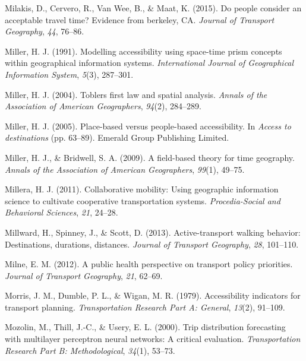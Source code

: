 \documentclass[
11pt, %
oneside, %
english, %
singlespacing, %
]{macthesis} %
\newlength{\cslhangindent}
\newenvironment{CSLReferences}[2] %
{\begin{list}{}{%
	\setlength{\itemindent}{0pt}
	\setlength{\leftmargin}{0pt}
	\setlength{\parsep}{0pt}
	\ifodd #1
	\setlength{\leftmargin}{\cslhangindent}
	\setlength{\itemindent}{-1\cslhangindent}
	\fi
	\setlength{\itemsep}{#2\baselineskip}}}
{\end{list}}
\begin{document}
\begin{CSLReferences}{1}{0}
Milakis, D., Cervero, R., Van Wee, B., \& Maat, K. (2015). Do people consider an acceptable travel time? Evidence from berkeley, CA. \emph{Journal of Transport Geography}, \emph{44}, 76--86.

Miller, H. J. (1991). Modelling accessibility using space-time prism concepts within geographical information systems. \emph{International Journal of Geographical Information System}, \emph{5}(3), 287--301.

Miller, H. J. (2004). Toblers first law and spatial analysis. \emph{Annals of the Association of American Geographers}, \emph{94}(2), 284--289.

Miller, H. J. (2005). Place-based versus people-based accessibility. In \emph{Access to destinations} (pp. 63--89). Emerald Group Publishing Limited.

Miller, H. J., \& Bridwell, S. A. (2009). A field-based theory for time geography. \emph{Annals of the Association of American Geographers}, \emph{99}(1), 49--75.

Millera, H. J. (2011). Collaborative mobility: Using geographic information science to cultivate cooperative transportation systems. \emph{Procedia-Social and Behavioral Sciences}, \emph{21}, 24--28.

Millward, H., Spinney, J., \& Scott, D. (2013). Active-transport walking behavior: Destinations, durations, distances. \emph{Journal of Transport Geography}, \emph{28}, 101--110.

Milne, E. M. (2012). A public health perspective on transport policy priorities. \emph{Journal of Transport Geography}, \emph{21}, 62--69.

Morris, J. M., Dumble, P. L., \& Wigan, M. R. (1979). Accessibility indicators for transport planning. \emph{Transportation Research Part A: General}, \emph{13}(2), 91--109.

Mozolin, M., Thill, J.-C., \& Usery, E. L. (2000). Trip distribution forecasting with multilayer perceptron neural networks: A critical evaluation. \emph{Transportation Research Part B: Methodological}, \emph{34}(1), 53--73.


\end{CSLReferences}
\end{document}
